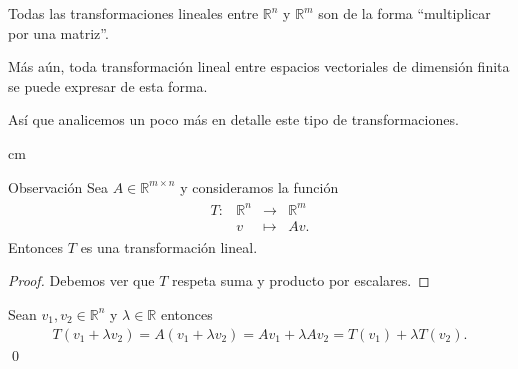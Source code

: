 \documentclass[handout]{beamer} %
\newcommand{\R}{\mathbb R}
\begin{document}
\begin{frame}

Todas las transformaciones lineales entre $\R^n$ y $\R^m$ son de la forma ``multiplicar por una matriz''.
\pause
\

Más aún,  toda transformación lineal entre espacios vectoriales de dimensión finita se puede expresar de esta forma.
\pause
\

Así que analicemos un poco más en detalle este tipo de transformaciones.

 cm
\end{frame}


\begin{frame}

\begin{block}{Observación}
Sea $A\in\R^{m\times n}$ y consideramos la función 
\begin{align*}
\begin{array}{rccc}
    T : &\R^n &\to &\R^m \\
        &v &\mapsto &Av.
\end{array}
\end{align*}
Entonces $T$ es una transformación lineal. \pause
\end{block}
\begin{proof}\pause
    Debemos ver que $T$ respeta suma y producto por escalares.
\end{proof}

\pause
Sean $v_1,v_2\in\R^n$ y $\lambda\in\R$ entonces
\begin{align*}
T(v_1+\lambda v_2)=A(v_1+\lambda v_2)=
Av_1+\lambda Av_2=T(v_1)+\lambda T(v_2).
\end{align*}
\qed


\end{frame}

\begin{frame}

    
\end{frame}
\end{document}
